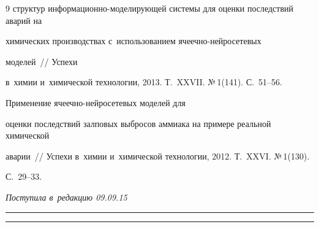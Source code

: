 {{\begin{thebibliography}{9}
структур ин\-фор\-ма\-ци\-он\-но-мо\-де\-ли\-ру\-ющей сис\-те\-мы для оценки последствий аварий на 


химических производствах с~использованием яче\-еч\-но-ней\-ро\-се\-те\-вых 


моделей~/\!\!/ Успехи 


в~химии и~химической технологии, 2013. Т.~XXVII. №\,1(141). С.~51--56.




   Применение ячеечно-нейросетевых моделей для 


оценки последствий залповых выбросов аммиака на примере реальной химической 


аварии~/\!\!/ Успехи в~химии и~химической технологии, 2012. Т.~XXVI. №\,1(130).


 С.~29--33.


     \end{thebibliography}


} }








\vspace*{-3pt}





\hfill{\small\textit{Поступила в~редакцию 09.09.15}}














\vspace*{9pt}





\hrule





\vspace*{2pt}





\hrule
















